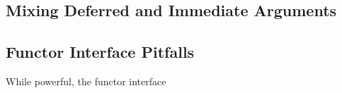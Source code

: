 \subsection{Mixing Deferred and Immediate Arguments}


\subsection{Functor Interface Pitfalls}

While powerful, the functor interface 

\lstDeleteShortInline{\|}